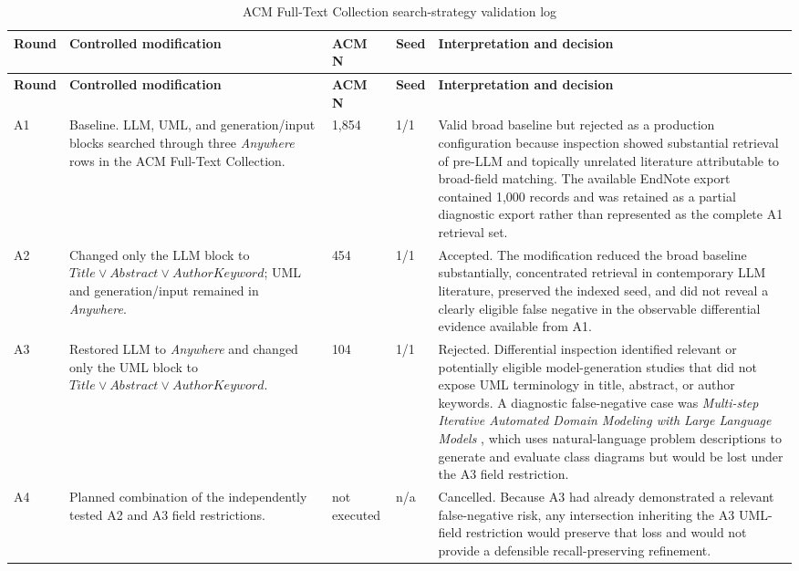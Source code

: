 \begin{longtable}{p{} p{} p{} p{} p{}}
\caption{ACM Full-Text Collection search-strategy validation log}
\label{tab:acm_validation_rounds}\\
\toprule
\textbf{Round} & \textbf{Controlled modification} & \textbf{ACM N} & \textbf{Seed} & \textbf{Interpretation and decision} \\
\midrule
\endfirsthead
\toprule
\textbf{Round} & \textbf{Controlled modification} & \textbf{ACM N} & \textbf{Seed} & \textbf{Interpretation and decision} \\
\midrule
\endhead
A1 & Baseline. LLM, UML, and generation/input blocks searched through three \emph{Anywhere} rows in the ACM Full-Text Collection. & 1,854 & 1/1 & Valid broad baseline but rejected as a production configuration because inspection showed substantial retrieval of pre-LLM and topically unrelated literature attributable to broad-field matching. The available EndNote export contained 1,000 records and was retained as a partial diagnostic export rather than represented as the complete A1 retrieval set. \\
A2 & Changed only the LLM block to \(Title\lor Abstract\lor AuthorKeyword\); UML and generation/input remained in \emph{Anywhere}. & 454 & 1/1 & Accepted. The modification reduced the broad baseline substantially, concentrated retrieval in contemporary LLM literature, preserved the indexed seed, and did not reveal a clearly eligible false negative in the observable differential evidence available from A1. \\
A3 & Restored LLM to \emph{Anywhere} and changed only the UML block to \(Title\lor Abstract\lor AuthorKeyword\). & 104 & 1/1 & Rejected. Differential inspection identified relevant or potentially eligible model-generation studies that did not expose UML terminology in title, abstract, or author keywords. A diagnostic false-negative case was \emph{Multi-step Iterative Automated Domain Modeling with Large Language Models} \cite{Yang2024MultiStepDomainModeling}, which uses natural-language problem descriptions to generate and evaluate class diagrams but would be lost under the A3 field restriction. \\
A4 & Planned combination of the independently tested A2 and A3 field restrictions. & not executed & n/a & Cancelled. Because A3 had already demonstrated a relevant false-negative risk, any intersection inheriting the A3 UML-field restriction would preserve that loss and would not provide a defensible recall-preserving refinement. \\
\bottomrule
\end{longtable}

